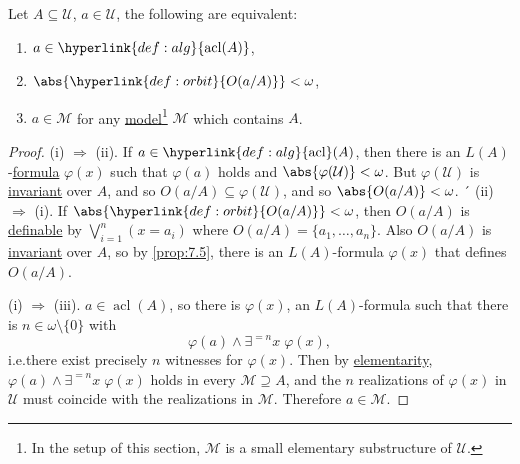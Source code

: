 \documentclass{article}
\DeclareMathOperator{\acl}{acl}
\newcommand{\U}{\mathcal{U}}
\begin{document}
\begin{nthm}\label{thm:7.12}
  Let $A \subseteq \U$, $a \in \U$, the following are equivalent:
  \begin{enumerate}[label=(\roman*)]
    \item $a \in \hyperlink{def:alg}{\acl(A)}$,
    \item $\abs{\hyperlink{def:orbit}{O(a/A)}} < \omega$,
    \item $a \in \mathcal{M}$ for any \hyperlink{def:model}{model}\footnote{In the setup of this section, $\mathcal{M}$ is a small elementary substructure of $\mathcal{U}$.} $\mathcal{M}$ which contains $A$.
  \end{enumerate}
\end{nthm}
\begin{proof}
  (i) $\Rightarrow$ (ii). If $a \in \hyperlink{def:alg}{\acl}(A)$, then there is an \hyperlink{def:la}{$L(A)$}-\hyperlink{def:form}{formula} $\varphi(x)$ such that $\varphi(a)$ holds and $\abs{\varphi(\U)} < \omega$.
  But $\varphi(\U)$ is \hyperlink{def:inv}{invariant} over $A$, and so $O(a/A) \subseteq \varphi(\U)$, and so $\abs{O(a/A)} < \omega$.
´
  (ii) $\Rightarrow$ (i). If $\abs{\hyperlink{def:orbit}{O(a/A)}} < \omega$, then $O(a/A)$ is \hyperlink{def:def}{definable} by $\bigvee_{i=1}^n (x = a_i)$ where $O(a/A) = \{a_1, \dotsc, a_n\}$.
  Also $O(a/A)$ is \hyperlink{def:inv}{invariant} over $A$, so by \cref{prop:7.5}, there is an $L(A)$-formula $\varphi(x)$ that defines $O(a/A)$.

  (i) $\Rightarrow$ (iii). $a \in \acl(A)$, so there is $\varphi(x)$, an $L(A)$-formula such that there is $n \in \omega\setminus\{0\}$ with
  \begin{equation*}
    \varphi(a) \wedge \exists^{=n} x \; \varphi(x),
  \end{equation*}
  i.e.\@ there exist precisely $n$ witnesses for $\varphi(x)$.
  Then by \hyperlink{def:elmap}{elementarity}, $\varphi(a) \wedge \exists^{=n} x \; \varphi(x)$ holds in every $\mathcal{M} \supseteq A$, and the $n$ realizations of $\varphi(x)$ in $\mathcal{U}$ must coincide with the realizations in $\mathcal{M}$.
  Therefore $a \in \mathcal{M}$.


\end{proof}
\end{document}
